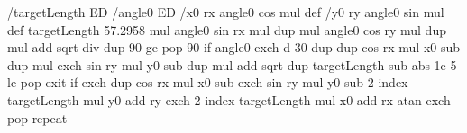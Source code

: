 %
%
%
	/targetLength ED /angle0 ED
	/x0 rx angle0 cos mul def
	/y0 ry angle0 sin mul def
	targetLength 57.2958 mul
	angle0 sin rx mul dup mul
	angle0 cos ry mul dup mul
	add sqrt div
	dup 90 ge { pop 90 } if
	angle0 exch d
	30
	{ dup
	dup cos rx mul x0 sub dup mul exch sin ry mul y0 sub dup mul add sqrt
	dup targetLength sub abs 1e-5 le { pop exit } if
	exch dup cos rx mul x0 sub  exch sin ry mul y0 sub
	2 index \tx@Div targetLength mul y0 add ry \tx@Div exch
	2 index \tx@Div targetLength mul x0 add rx \tx@Div
	atan exch pop
	} repeat
